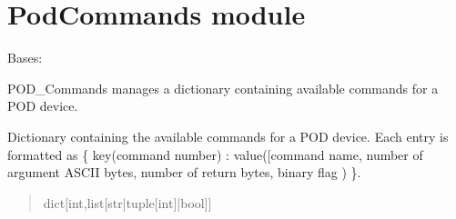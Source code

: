 \documentclass[letterpaper,10pt,english]{sphinxmanual}
\begin{document}
\sphinxstepscope


\section{PodCommands module}
\label{\detokenize{PodCommands:module-PodCommands}}\label{\detokenize{PodCommands:podcommands-module}}\label{\detokenize{PodCommands::doc}}

\begin{fulllineitems}
\label{\detokenize{PodCommands:PodCommands.POD_Commands}}
\pysigstartsignatures
{}
\pysigstopsignatures
\sphinxAtStartPar
Bases: 

\sphinxAtStartPar
POD\_Commands manages a dictionary containing available commands for a POD device.

\begin{fulllineitems}
\label{\detokenize{PodCommands:PodCommands.POD_Commands.__commands}}
\pysigstartsignatures
{}
\pysigstopsignatures
\sphinxAtStartPar
Dictionary containing the available commands for             a POD device. Each entry is formatted as \{ key(command number) : value({[}command name, number             of argument ASCII bytes, number of return bytes, binary flag ) \}.
\begin{quote}\begin{description}
\sphinxAtStartPar
dict{[}int,list{[}str|tuple{[}int{]}|bool{]}{]}

\end{description}\end{quote}

\end{fulllineitems}



\end{fulllineitems}
\end{document}
